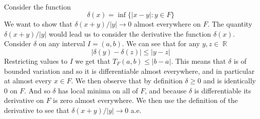 \documentclass{article}
\DeclareMathOperator{\R}{\mathbb{R}}
\newcommand{\problem}[1]{\noindent{\textbf{Problem #1}}\\}
\begin{document}
\problem{3.5.9} Consider the function
\[
\delta(x) = \inf\{|x-y| : y \in F\}
\]
We want to show that $\delta(x+y)/|y| \to 0$ almost everywhere on $F$. The quantity $\delta(x+y)/|y|$ would lead us to consider the derivative the function $\delta(x)$. Consider $\delta$ on any interval $I = (a,b)$. We can see that for any $y,z \in \R$
\[
|\delta(y) - \delta(z)| \leq |y-z| 
\]
Restricting values to $I$ we get that $T_F(a,b) \leq |b-a|$. This means that $\delta$ is of bounded variation and so it is differentiable almost everywhere, and in particular at almost every $x \in F$. We then observe that by definition $\delta \geq 0$ and is identically 0 on $F$. And so $\delta$ has local minima on all of $F$, and because $\delta$ is differentiable its derivative on $F$ is zero almost everywhere. We then use the definition of the derivative to see that $\delta(x+y)/|y| \to 0$ a.e.
\end{document}
